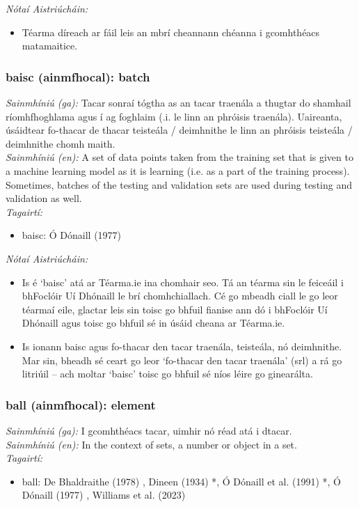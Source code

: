  \noindent \textit{Nótaí Aistriúcháin:}
\begin{itemize}
	\item Téarma díreach ar fáil leis an mbrí cheannann chéanna i gcomhthéacs matamaitice.
\end{itemize}


\subsubsection*{baisc (ainmfhocal): batch}
 \noindent \textit{Sainmhíniú (ga):} Tacar sonraí tógtha as an tacar traenála a thugtar do shamhail ríomhfhoghlama agus í ag foghlaim (.i. le linn an phróisis traenála). Uaireanta, úsáidtear fo-thacar de thacar teisteála / deimhnithe le linn an phróisis teisteála / deimhnithe chomh maith.
\\
 \noindent \textit{Sainmhíniú (en):} A set of data points taken from the training set that is given to a machine learning model as it is learning (i.e. as a part of the training process). Sometimes, batches of the testing and validation sets are used during testing and validation as well.
\\
 \noindent \textit{Tagairtí:}
\begin{itemize}
	\item baisc: Ó Dónaill (1977) \cite{odonaill}
\end{itemize}

 \noindent \textit{Nótaí Aistriúcháin:}
\begin{itemize}
	\item Is é `baisc' atá ar Téarma.ie ina chomhair seo. Tá an téarma sin le feiceáil i bhFoclóir Uí Dhónaill le brí chomhchiallach. Cé go mbeadh ciall le go leor téarmaí eile, glactar leis sin toisc go bhfuil fianise ann dó i bhFoclóir Uí Dhónaill agus toisc go bhfuil sé in úsáid cheana ar Téarma.ie.
	\item Is ionann baisc agus fo-thacar den tacar traenála, teisteála, nó deimhnithe. Mar sin, bheadh sé ceart go leor `fo-thacar den tacar traenála' (srl) a rá go litriúil -- ach moltar `baisc' toisc go bhfuil sé níos léire go ginearálta.
\end{itemize}


\subsubsection*{ball (ainmfhocal): element}
 \noindent \textit{Sainmhíniú (ga):} I gcomhthéacs tacar, uimhir nó réad atá i dtacar.
\\
 \noindent \textit{Sainmhíniú (en):} In the context of sets, a number or object in a set.
\\
 \noindent \textit{Tagairtí:}
\begin{itemize}
	\item ball: De Bhaldraithe (1978) \cite{de-bhaldraithe}, Dineen (1934) \cite{dineen}*, Ó Dónaill et al. (1991) \cite{focloir-beag}*, Ó Dónaill (1977) \cite{odonaill}, Williams et al. (2023) \cite{storchiste}
\end{itemize}

